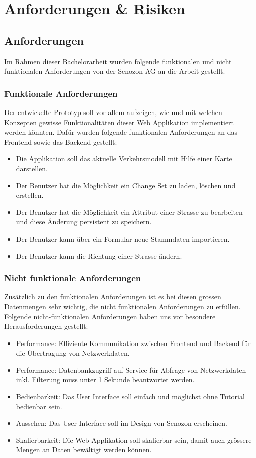 \chapter{Anforderungen \& Risiken} \label{ch:anforderungen_section}
\section{Anforderungen}
Im Rahmen dieser Bachelorarbeit wurden folgende funktionalen und nicht funktionalen Anforderungen von der Senozon AG an die Arbeit gestellt.
\subsection{Funktionale Anforderungen}
Der entwickelte Prototyp soll vor allem aufzeigen, wie und mit welchen Konzepten gewisse Funktionalitäten dieser Web Applikation implementiert werden könnten. Dafür wurden folgende funktionalen Anforderungen an das Frontend sowie das Backend gestellt:
\begin{itemize}
\item Die Applikation soll das aktuelle Verkehrsmodell mit Hilfe einer Karte darstellen.
\item Der Benutzer hat die Möglichkeit ein Change Set zu laden, löschen und erstellen.
\item Der Benutzer hat die Möglichkeit ein Attribut einer Strasse zu bearbeiten und diese Änderung persistent zu speichern.
\item Der Benutzer kann über ein Formular neue Stammdaten importieren.
\item Der Benutzer kann die Richtung einer Strasse ändern.
\end{itemize}
\subsection{Nicht funktionale Anforderungen}
Zusätzlich zu den funktionalen Anforderungen ist es bei diesen grossen Datenmengen sehr wichtig, die nicht funktionalen Anforderungen zu erfüllen. Folgende nicht-funktionalen Anforderungen haben uns vor besondere Herausforderungen gestellt:
\begin{itemize}
\item Performance: Effiziente Kommunikation zwischen Frontend und Backend für die Übertragung von Netzwerkdaten.
\item Performance: Datenbankzugriff auf Service für Abfrage von Netzwerkdaten inkl. Filterung muss unter 1 Sekunde beantwortet werden.
\item Bedienbarkeit: Das User Interface soll einfach und möglichst ohne Tutorial bedienbar sein.
\item Aussehen: Das User Interface soll im Design von Senozon erscheinen.
\item Skalierbarkeit: Die Web Applikation soll skalierbar sein, damit auch grössere Mengen an Daten bewältigt werden können.
\end{itemize}
